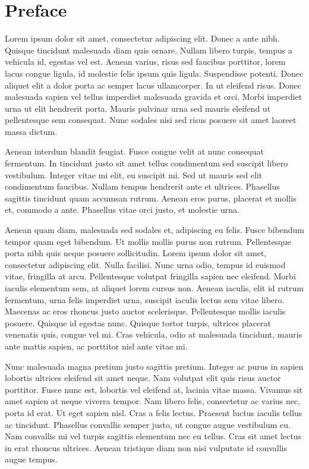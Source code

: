 \chapter{Preface}
Lorem ipsum dolor sit amet, consectetur adipiscing elit. Donec a ante nibh.
Quisque tincidunt malesuada diam quis ornare. Nullam libero turpis, tempus a
vehicula id, egestas vel est. Aenean varius, risus sed faucibus porttitor,
lorem lacus congue ligula, id molestie felis ipsum quis ligula. Suspendisse
potenti. Donec aliquet elit a dolor porta ac semper lacus ullamcorper. In ut
eleifend risus. Donec malesuada sapien vel tellus imperdiet malesuada gravida
et orci. Morbi imperdiet urna ut elit hendrerit porta. Mauris pulvinar urna sed
mauris eleifend ut pellentesque sem consequat. Nunc sodales nisi sed risus
posuere sit amet laoreet massa dictum.

Aenean interdum blandit feugiat. Fusce congue velit at nunc consequat
fermentum. In tincidunt justo sit amet tellus condimentum sed suscipit libero
vestibulum. Integer vitae mi elit, eu suscipit mi. Sed ut mauris sed elit
condimentum faucibus. Nullam tempus hendrerit ante et ultrices. Phasellus
sagittis tincidunt quam accumsan rutrum. Aenean eros purus, placerat et mollis
et, commodo a ante. Phasellus vitae orci justo, et molestie urna.

Aenean quam diam, malesuada sed sodales et, adipiscing eu felis. Fusce bibendum
tempor quam eget bibendum. Ut mollis mollis purus non rutrum. Pellentesque
porta nibh quis neque posuere sollicitudin. Lorem ipsum dolor sit amet,
consectetur adipiscing elit. Nulla facilisi. Nunc urna odio, tempus id euismod
vitae, fringilla at arcu. Pellentesque volutpat fringilla sapien nec eleifend.
Morbi iaculis elementum sem, at aliquet lorem cursus non. Aenean iaculis, elit
id rutrum fermentum, urna felis imperdiet urna, suscipit iaculis lectus sem
vitae libero. Maecenas ac eros rhoncus justo auctor scelerisque. Pellentesque
mollis iaculis posuere. Quisque id egestas nunc. Quisque tortor turpis,
ultrices placerat venenatis quis, congue vel mi. Cras vehicula, odio at
malesuada tincidunt, mauris ante mattis sapien, ac porttitor nisl ante vitae
mi.

Nunc malesuada magna pretium justo sagittis pretium. Integer ac purus in sapien
lobortis ultrices eleifend sit amet neque. Nam volutpat elit quis risus auctor
porttitor. Fusce nunc est, lobortis vel eleifend at, lacinia vitae massa.
Vivamus sit amet sapien at neque viverra tempor. Nam libero felis, consectetur
ac varius nec, porta id erat. Ut eget sapien nisl. Cras a felis lectus.
Praesent luctus iaculis tellus ac tincidunt. Phasellus convallis semper justo,
ut congue augue vestibulum eu. Nam convallis mi vel turpis sagittis elementum
nec eu tellus. Cras sit amet lectus in erat rhoncus ultrices. Aenean tristique
diam non nisi vulputate id convallis augue tempus.

